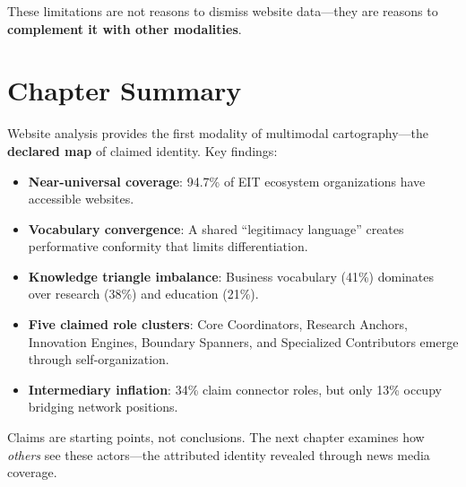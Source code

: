 \documentclass[../main.tex]{subfiles}
\begin{document}
These limitations are not reasons to dismiss website data---they are reasons to \textbf{complement it with other modalities}.


\section*{Chapter Summary}

\begin{summarybox}
Website analysis provides the first modality of multimodal cartography---the \textbf{declared map} of claimed identity. Key findings:

\begin{itemize}[leftmargin=*, itemsep=0.3em]
\item \textbf{Near-universal coverage}: 94.7\% of EIT ecosystem organizations have accessible websites.

\item \textbf{Vocabulary convergence}: A shared ``legitimacy language'' creates performative conformity that limits differentiation.

\item \textbf{Knowledge triangle imbalance}: Business vocabulary (41\%) dominates over research (38\%) and education (21\%).

\item \textbf{Five claimed role clusters}: Core Coordinators, Research Anchors, Innovation Engines, Boundary Spanners, and Specialized Contributors emerge through self-organization.

\item \textbf{Intermediary inflation}: 34\% claim connector roles, but only 13\% occupy bridging network positions.
\end{itemize}

Claims are starting points, not conclusions. The next chapter examines how \emph{others} see these actors---the attributed identity revealed through news media coverage.
\end{summarybox}

\vspace{0.5cm}

\begin{center}
\end{center}

\closeintermezzo
\end{document}
